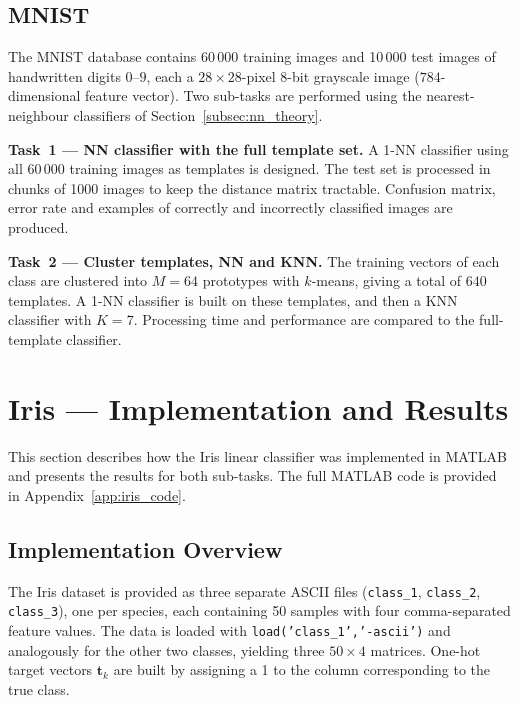 \documentclass[11pt,a4paper]{article}
\begin{document}
\subsection*{MNIST}
The MNIST database contains 60\,000 training images and 10\,000 test images of handwritten digits $0$--$9$, each a $28\!\times\!28$-pixel 8-bit grayscale image ($784$-dimensional feature vector). Two sub-tasks are performed using the nearest-neighbour classifiers of Section~\ref{subsec:nn_theory}.

\textbf{Task~1 --- NN classifier with the full template set.} A 1-NN classifier using all 60\,000 training images as templates is designed. The test set is processed in chunks of 1000 images to keep the distance matrix tractable. Confusion matrix, error rate and examples of correctly and incorrectly classified images are produced.

\textbf{Task~2 --- Cluster templates, NN and KNN.} The training vectors of each class are clustered into $M=64$ prototypes with $k$-means, giving a total of $640$ templates. A 1-NN classifier is built on these templates, and then a KNN classifier with $K=7$. Processing time and performance are compared to the full-template classifier.

\section{Iris --- Implementation and Results}
\label{sec:iris_results}

This section describes how the Iris linear classifier was implemented in MATLAB and presents the results for both sub-tasks. The full MATLAB code is provided in Appendix~\ref{app:iris_code}.

\subsection{Implementation Overview}

The Iris dataset is provided as three separate ASCII files (\texttt{class\_1}, \texttt{class\_2}, \texttt{class\_3}), one per species, each containing 50 samples with four comma-separated feature values. The data is loaded with \texttt{load('class\_1','-ascii')} and analogously for the other two classes, yielding three $50 \times 4$ matrices. One-hot target vectors $\mathbf{t}_k$ are built by assigning a 1 to the column corresponding to the true class.
\end{document}
